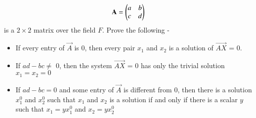 \begin{enumerate}[label=\thesubsection.\arabic*.,ref=\thesubsection.\theenumi]
\begin{align*}
    \mathbf{A} = \begin{pmatrix}a&b\\c&d\end{pmatrix}
\end{align*}
is a $2\times2$ matrix over the field $F$. Prove the following - 
\begin{itemize}
    \item If every entry of $\vec{A}$ is 0, then every pair $x_1$ and $x_2$ is a solution of $\vec{AX}$ = 0.
    \item If $ad - bc \not=$ 0, then the system $\vec{AX}$ = 0 has only the trivial solution $x_1 = x_2 = 0$
    \item If $ad - bc = 0$ and some entry of $\vec{A}$ is different from 0, then there is a solution $x_1^0$ and $x_2^0$ such that $x_1$ and  $x_2$ is a solution if and only if there is a scalar $y$ such that $x_1 = yx_1^0$ and $x_2 = yx_2^0$
\end{itemize}
%
\solution

%

\end{enumerate}


